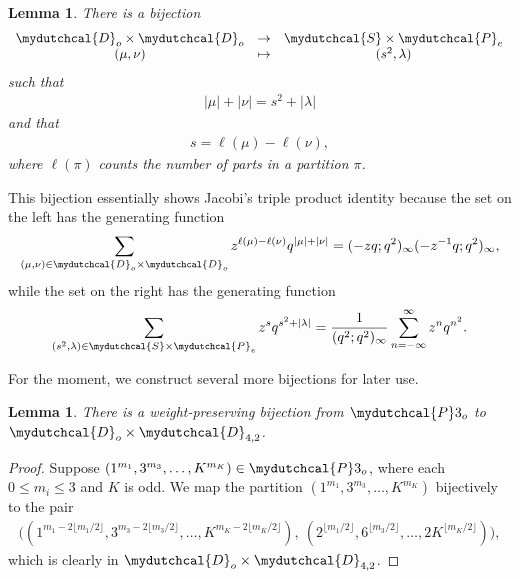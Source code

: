 \documentclass[12pt,reqno]{amsart}
\numberwithin{equation}{section}
\theoremstyle{plain}
\newtheorem{lemma}[theorem]{Lemma}
\theoremstyle{definition}
\theoremstyle{named}
\newcommand{\cP}{\mydutchcal{P}}
\newcommand{\cD}{\mydutchcal{D}}
\newcommand{\cS}{\mydutchcal{S}}
\begin{document}
\begin{lemma}\label{lemma:theta}
	There is a bijection
	\begin{align*}
		\begin{array}{ccc}
			\cD_{o}\times \cD_{o} & \to & \cS\times \cP_{e}\\
			(\mu,\nu) & \mapsto & (s^2,\lambda)
		\end{array}
	\end{align*}
	such that
	\begin{align*}
		|\mu|+|\nu|=s^2+|\lambda|
	\end{align*}
	and that
	\begin{align*}
		s=\ell(\mu)-\ell(\nu),
	\end{align*}
	where $\ell(\pi)$ counts the number of parts in a partition $\pi$.
\end{lemma}

This bijection essentially shows Jacobi's triple product identity because the set on the left has the generating function
\begin{align*}
	\sum_{(\mu,\nu)\in \cD_{o}\times \cD_{o}}z^{\ell(\mu)-\ell(\nu)}q^{|\mu|+|\nu|} = (-zq;q^2)_\infty(-z^{-1}q;q^2)_\infty,
\end{align*}
while the set on the right has the generating function
\begin{align*}
	\sum_{(s^2,\lambda)\in \cS\times \cP_{e}}z^{s}q^{s^2+|\lambda|} = \frac{1}{(q^2;q^2)_\infty}\sum_{n=-\infty}^\infty z^n q^{n^2}.
\end{align*}

For the moment, we construct several more bijections for later use.

\begin{lemma}\label{lemma:splitP3o}
	There is a weight-preserving bijection from $\cP3_{o}$ to $\cD_{o} \times \cD_{4,2}$.
\end{lemma}

\begin{proof}
	Suppose 
	$(1^{m_1},3^{m_3}, \dots, K^{m_K}) \in \cP3_o$, where each $0 \leq m_i \leq 3$ and $K$ is odd. We map the partition $(1^{m_1},3^{m_3}, \dots, K^{m_K})$ bijectively to the pair
	\begin{align*}
		\big((1^{m_1 - 2\lfloor m_1/2 \rfloor},3^{m_3 - 2\lfloor m_3/2 \rfloor}, \dots, K^{m_K-2\lfloor m_K/2 \rfloor}), \ (2^{\lfloor m_1/2 \rfloor},6^{\lfloor m_3/2 \rfloor},\dots, 2K^{\lfloor m_K/2 \rfloor})\big),
	\end{align*}
	which is clearly in $\cD_{o} \times \cD_{4,2}$.
\end{proof}
\end{document}
